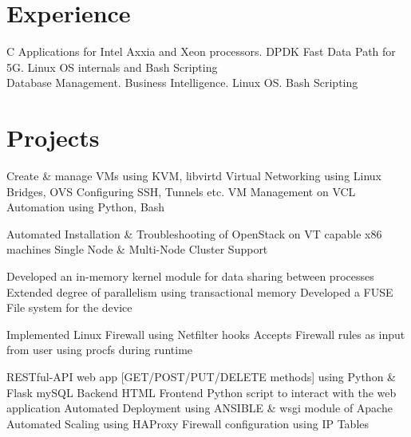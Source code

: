 \documentclass[print]{danis-resume}
\begin{document}
\hfill
\begin{minipage}[t]{0.66\textwidth} 


\section{Experience}
C Applications for Intel Axxia and Xeon processors. DPDK Fast Data Path for 5G. Linux OS internals and Bash Scripting
\sectionsep
\\
Database Management. Business Intelligence. Linux OS. Bash Scripting


\section{Projects}
Create \& manage VMs using KVM, libvirtd \textbullet{} Virtual Networking using Linux Bridges, OVS \textbullet{} Configuring SSH, Tunnels etc. \textbullet{} VM Management on VCL \textbullet{} Automation using Python, Bash
\sectionsep

Automated Installation \& Troubleshooting of OpenStack on VT capable x86 machines \textbullet{} Single Node \& Multi-Node Cluster Support
\sectionsep

Developed an in-memory kernel module for data sharing between processes  \textbullet{} Extended degree of parallelism using transactional memory \textbullet{} Developed a FUSE File system for the device
\sectionsep

Implemented Linux Firewall using Netfilter hooks \textbullet{} Accepts Firewall rules as input from user using procfs during runtime
\sectionsep

RESTful-API web app [GET/POST/PUT/DELETE methods] using Python \& Flask \textbullet{}mySQL Backend \textbullet{} HTML Frontend \textbullet{} Python script to interact with the web application \textbullet{}  Automated Deployment using ANSIBLE \& wsgi module of Apache \textbullet{} Automated Scaling using HAProxy \textbullet{} Firewall configuration using IP Tables
\sectionsep


\end{minipage}
\end{document}
